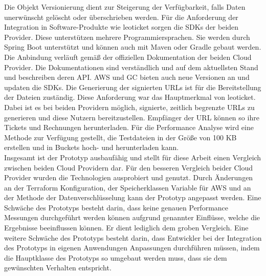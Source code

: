 Die Objekt Versionierung dient zur Steigerung der Verfügbarkeit, falls Daten unerwünscht gelöscht oder überschrieben werden. Für die Anforderung der Integration in Software-Produkte wie leoticket sorgen die SDKs der beiden Provider. Diese unterstützen mehrere Programmiersprachen. Sie werden durch Spring Boot unterstützt und können auch mit Maven oder Gradle gebaut werden. Die Anbindung verläuft gemäß der offiziellen Dokumentation der beiden Cloud Provider. Die Dokumentationen sind verständlich und auf dem aktuellsten Stand und beschreiben deren API. AWS und GC bieten auch neue Versionen an und updaten die SDKs. Die Generierung der signierten URLs ist für die Bereitstellung der Dateien zuständig. Diese Anforderung war das Hauptmerkmal von leoticket. Dabei ist es bei beiden Providern möglich, signierte, zeitlich begrenzte URLs zu generieren und diese Nutzern bereitzustellen. Empfänger der URL können so ihre Tickets und Rechnungen herunterladen. Für die Performance Analyse wird eine Methode zur Verfügung gestellt, die Testdateien in der Größe von 100 KB erstellen und in Buckets hoch- und herunterladen kann.\\

Insgesamt ist der Prototyp ausbaufähig und stellt für diese Arbeit einen Vergleich zwischen beiden Cloud Providern dar. Für den besseren Vergleich beider Cloud Provider wurden die Technologien ausprobiert und genutzt. Durch Änderungen an der Terraform Konfiguration, der Speicherklassen Variable für AWS und an der Methode der Datenverschlüsselung kann der Prototyp angepasst werden. Eine Schwäche des Prototyps besteht darin, dass keine genauen Performance Messungen durchgeführt werden können aufgrund genannter Einflüsse, welche die Ergebnisse beeinflussen können. Er dient lediglich dem groben Vergleich. Eine weitere Schwäche des Prototyps besteht darin, dass Entwickler bei der Integration des Prototyps in eigenen Anwendungen Anpassungen durchführen müssen, indem die Hauptklasse des Prototyps so umgebaut werden muss, dass sie dem gewünschten Verhalten entspricht.